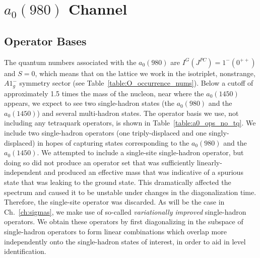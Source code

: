 \section{$a_0(980)$ Channel}\label{sec:a0}
\subsection{Operator Bases}
The quantum numbers associated with the $a_0(980)$ are $I^G(J^{PC}) = 1^-(0^{++})$ and $S = 0$, which means that on the lattice we work in the isotriplet, nonstrange, $A1_g^-$ symmetry sector (see Table~\ref{table:O_occurrence_nums}). Below a cutoff of approximately 1.5 times the mass of the nucleon, near where the $a_0(1450)$ appears, we expect to see two single-hadron states (the $a_0(980)$ and the $a_0(1450)$) and several multi-hadron states. The operator basis we use, not including any tetraquark operators, is shown in Table~\ref{table:a0_ops_no_tq}. We include two single-hadron operators (one triply-displaced and one singly-displaced) in hopes of capturing states corresponding to the $a_0(980)$ and the $a_0(1450)$. We attempted to include a single-site single-hadron operator, but doing so did not produce an operator set that was sufficiently linearly-independent and produced an effective mass that was indicative of a spurious state that was leaking to the ground state. This dramatically affected the spectrum and caused it to be unstable under changes in the diagonalization time. Therefore, the single-site operator was discarded. As will be the case in Ch.~\ref{ch:sigmas}, we make use of so-called \emph{variationally improved} single-hadron operators. We obtain these operators by first diagonalizing in the subspace of single-hadron operators to form linear combinations which overlap more independently onto the single-hadron states of interest, in order to aid in level identification.

